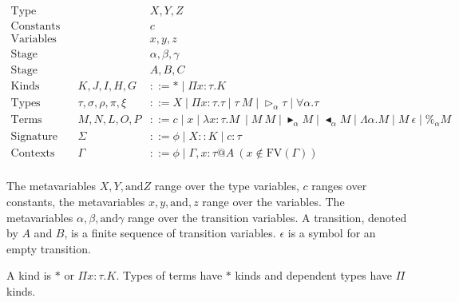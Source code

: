 \documentclass[runningheads]{llncs}
\newcommand{\G}{\Gamma}
\newcommand{\TW}{\triangleright}
\newcommand{\F}{\forall}
\newcommand{\TB}{\blacktriangleright}
\newcommand{\TBL}{\blacktriangleleft}
\begin{document}
\begin{align*}
	\textrm{Type variables}  &  &                          & X,Y,Z                                                                             \\
	\textrm{Constants}       &  &                          & c                                                                                 \\
	\textrm{Variables}       &  &                          & x,y,z                                                                             \\
	\textrm{Stage variables} &  &                          & \alpha,\beta,\gamma                                                               \\
	\textrm{Stage}           &  &                          & A,B,C                                                                             \\
	\textrm{Kinds}           &  & K,J,I,H,G                & ::= * \mid \Pi x:\tau.K                                                           \\
	\textrm{Types}           &  & \tau,\sigma,\rho,\pi,\xi & ::= X \mid \Pi x:\tau.\tau \mid \tau\ M \mid \TW_{\alpha} \tau \mid \F\alpha.\tau \\
	\textrm{Terms}           &  & M,N,L,O,P                & ::= c \mid x \mid \lambda x:\tau.M\ \mid M\ M \mid \TB_\alpha M 
	\mid \TBL_\alpha M \mid \Lambda\alpha.M \mid M\ \epsilon \mid \%_\alpha M                                                                  \\ 
	\textrm{Signature}       &  & \Sigma                   & ::= \phi \mid X::K \mid c:\tau                                                    \\
	\textrm{Contexts}        &  & \Gamma                   & ::= \phi \mid  \Gamma,x:\tau @A\ (x\not\in\textrm{FV}(\G))                         \\
\end{align*}

The metavariables $X, Y, \text{and} Z$ range over the type variables, $c$ ranges over constants, the metavariables $x, y, \text{and}, z$ range over the variables.
The metavariables $\alpha, \beta, \text{and} \gamma$ range over the transition variables.
A transition, denoted by $A$ and $B$, is a finite sequence of transition variables.
$\epsilon$ is a symbol for an empty transition.

A kind is $*$ or $\Pi x:\tau.K$. Types of terms have $*$ kinds and dependent types have $\Pi$ kinds.
\end{document}
